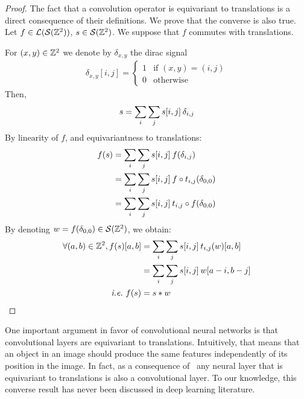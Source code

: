 \begin{proof}
The fact that a convolution operator is equivariant to translations is a direct consequence of their definitions. We prove that the converse is also true.
Let $f \in \cl(\cs(\bbz^2))$, $s \in \cs(\bbz^2)$. We suppose that $f$ commutes with translations.

For $(x,y) \in \bbz^2$ we denote by $\delta_{x,y}$ the dirac signal
\begin{gather*}
\delta_{x,y}[i,j] = \begin{cases} 1 & \text{if } (x,y) = (i,j)\\ 0 & \text{otherwise} \end{cases}
\end{gather*}
Then,
\begin{gather*}
s = \displaystyle \sum_i \sum_j s[i,j] \h{2} \delta_{i,j}
\end{gather*}
By linearity of $f$, and equivariantness to translations:
\begin{align*}
f(s) & = \displaystyle \sum_i \sum_j s[i,j] \h{2} f(\delta_{i,j})\\
 & = \displaystyle \sum_i \sum_j s[i,j] \h{2} f \circ t_{i,j} (\delta_{0,0})\\
 & = \displaystyle \sum_i \sum_j s[i,j] \h{2} t_{i,j} \circ f (\delta_{0,0})
\end{align*}
By denoting $w = f (\delta_{0,0}) \in \cs(\bbz^2)$, we obtain:
\begin{align}
\forall (a,b) \in \bbz^2, f(s)[a,b] & = \displaystyle \sum_i \sum_j s[i,j] \h{2} t_{i,j}(w)[a,b] \label{eq:conv}\\
 & = \displaystyle \sum_i \sum_j s[i,j] \h{2} w[a-i, b-j] \nonumber\\
\text{\ie } f(s) & = s \ast w \nonumber
\end{align}
\end{proof}

One important argument in favor of convolutional neural networks is that convolutional layers are equivariant to translations. Intuitively, that means that an object in an image should produce the same features independently of its position in the image. In fact, as a consequence of~ any neural layer that is equivariant to translations is also a convolutional layer. To our knowledge, this converse result has never been discussed in deep learning literature.


